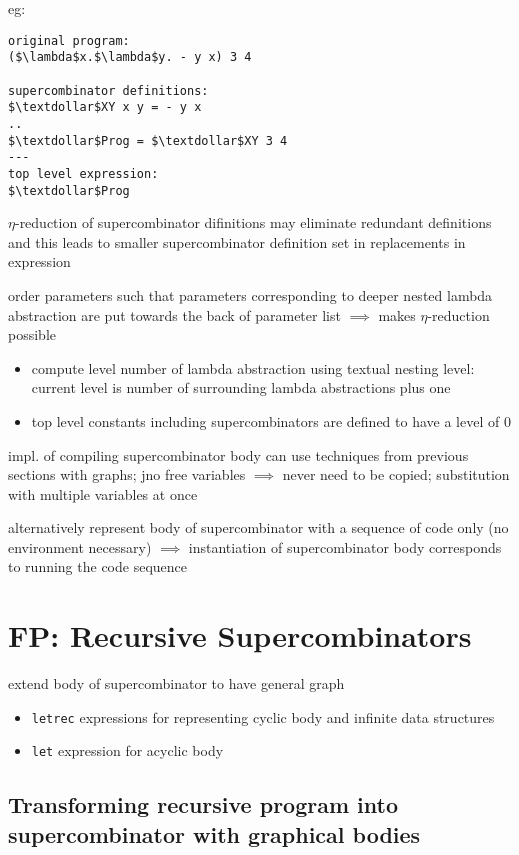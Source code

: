 \documentclass[8pt]{extarticle}
\begin{document}
\begin{multicols*}{2}
eg:

\begin{lstlisting}
original program:
($\lambda$x.$\lambda$y. - y x) 3 4

supercombinator definitions:
$\textdollar$XY x y = - y x
..
$\textdollar$Prog = $\textdollar$XY 3 4
---
top level expression:
$\textdollar$Prog
\end{lstlisting}

$\eta$-reduction of supercombinator difinitions may eliminate redundant definitions and this leads to smaller supercombinator definition set in replacements in expression

order parameters such that parameters corresponding to deeper nested lambda abstraction are put towards the back of parameter list $\implies$ makes $\eta$-reduction possible
\begin{itemize}
\item compute level number of lambda abstraction using textual nesting level: current level is number of surrounding lambda abstractions plus one
\item top level constants including supercombinators are defined to have a level of 0
\end{itemize}

impl. of compiling supercombinator body can use techniques from previous sections with graphs; jno free variables $\implies$ never need to be copied; substitution with multiple variables at once

alternatively represent body of supercombinator with a sequence of code only (no environment necessary) $\implies$ instantiation of supercombinator body corresponds to running the code sequence

\vfill\null
\columnbreak

\section{FP: Recursive Supercombinators}

extend body of supercombinator to have general graph

\begin{itemize}
\item \verb|letrec| expressions for representing cyclic body and infinite data structures
\item \verb|let| expression for acyclic body
\end{itemize}

\subsection{Transforming recursive program into supercombinator with graphical bodies}


\end{multicols*}
\end{document}
